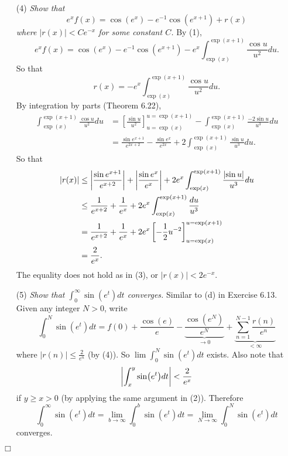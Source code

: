 \documentclass{article}
\begin{document}
\begin{enumerate}
  \item[(4)]
  \emph{Show that
  \[
    e^x f(x) = \cos(e^x) - e^{-1} \cos(e^{x+1}) + r(x)
  \]
  where $|r(x)| < Ce^{-x}$ for some constant $C$.}
  By (1),
  \[
    e^x f(x) = \cos(e^x) - e^{-1}\cos(e^{x+1})
      - e^x \int_{\exp(x)}^{\exp(x+1)} \frac{\cos u}{u^2} du.
  \]
  So that
  \[
    r(x) = - e^x \int_{\exp(x)}^{\exp(x+1)} \frac{\cos u}{u^2} du.
  \]
  By integration by parts (Theorem 6.22),
  \begin{align*}
    \int_{\exp(x)}^{\exp(x+1)} \frac{\cos u}{u^2} du
    &= \left[ \frac{\sin u}{u^2} \right]_{u=\exp(x)}^{u=\exp(x+1)}
      - \int_{\exp(x)}^{\exp(x+1)} \frac{-2 \sin u}{u^3} du \\
    &= \frac{\sin e^{x+1}}{e^{2x+2}} - \frac{\sin e^{x}}{e^{2x}}
      + 2 \int_{\exp(x)}^{\exp(x+1)} \frac{\sin u}{u^3} du.
  \end{align*}
  So that
  \begin{align*}
    |r(x)|
    &\leq \abs{ \frac{\sin e^{x+1}}{e^{x+2}} }
      + \abs{ \frac{\sin e^{x}}{e^{x}} }
      + 2 e^x \int_{\exp(x)}^{\exp(x+1)} \frac{\abs{\sin u}}{u^3} du \\
    &\leq \frac{1}{e^{x+2}}
      + \frac{1}{e^{x}}
      + 2 e^x \int_{\exp(x)}^{\exp(x+1)} \frac{du}{u^3} \\
    &= \frac{1}{e^{x+2}}
      + \frac{1}{e^{x}}
      + 2 e^x \left[ -\frac{1}{2} u^{-2} \right]_{u=\exp(x)}^{u=\exp(x+1)} \\
    &= \frac{2}{e^{x}}.
  \end{align*}
  The equality does not hold as in (3), or $|r(x)| < 2 e^{-x}$.

  \item[(5)]
  \emph{Show that $\int_{0}^{\infty} \sin(e^t) dt$ converges.}
  Similar to (d) in Exercise 6.13.
  Given any integer $N > 0$, write
  \[
    \int_{0}^{N} \sin(e^t) dt
    = f(0) + \frac{\cos(e)}{e} - \underbrace{\frac{\cos(e^N)}{e^N}}_{\to 0}
      + \underbrace{\sum_{n=1}^{N-1} \frac{r(n)}{e^n}}_{< \infty}
  \]
  where $|r(n)| \leq \frac{2}{e^n}$ (by (4)).
  So $\lim \int_{0}^{N} \sin(e^t) dt$ exists.
  Also note that
  \[
    \abs{ \int_{x}^{y} \sin(e^t) dt } < \frac{2}{e^x}
  \]
  if $y \geq x > 0$ (by applying the same argument in (2)).
  Therefore
  \[
    \int_{0}^{\infty} \sin(e^t) dt
    = \lim_{b \to \infty} \int_{0}^{b} \sin(e^t) dt
    = \lim_{N \to \infty} \int_{0}^{N} \sin(e^t) dt
  \]
  converges.
\end{enumerate}
$\Box$ \\
\end{document}
